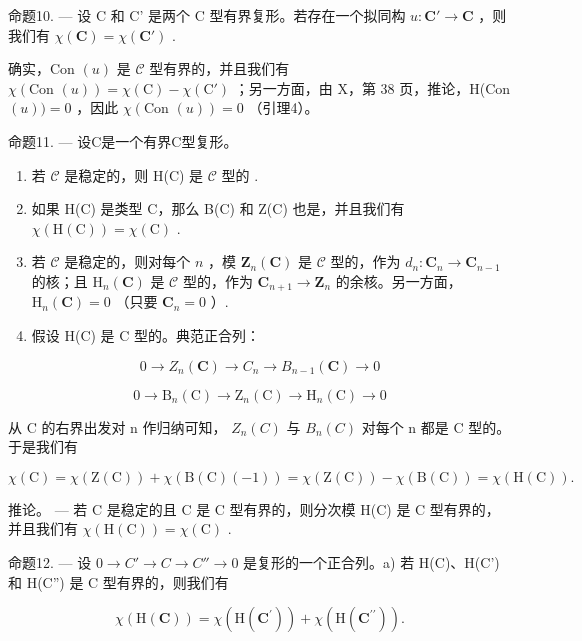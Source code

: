 命题10. --- 设 C 和 C' 是两个 C 型有界复形。若存在一个拟同构 \(u: \mathbf{C}' \to \mathbf{C}\) ，则我们有 \(\chi(\mathbf{C}) = \chi(\mathbf{C}')\) .

确实，Con \((u)\) 是 \(\mathcal{C}\) 型有界的，并且我们有 \(\chi(\text{Con } (u)) = \chi(\text{C}) - \chi(\text{C}')\) ；另一方面，由 X，第 38 页，推论，H(Con \((u)) = 0\) ，因此 \(\chi(\text{Con } (u)) = 0\) （引理4）。

命题11. --- 设C是一个有界C型复形。

\begin{enumerate}
\def\labelenumi{\alph{enumi})}
\item
  若 \(\mathcal{C}\) 是稳定的，则 H(C) 是 \(\mathcal{C}\) 型的 .
\item
  如果 H(C) 是类型 C，那么 B(C) 和 Z(C) 也是，并且我们有 \(\chi(\mathrm{H}(\mathrm{C})) = \chi(\mathrm{C})\) .
\item
  若 \(\mathcal{C}\) 是稳定的，则对每个 \(n\) ，模 \(\mathbf{Z}_n(\mathbf{C})\) 是 \(\mathcal{C}\) 型的，作为 \(d_n: \mathbf{C}_n \to \mathbf{C}_{n-1}\) 的核；且 \(\mathrm{H}_n(\mathbf{C})\) 是 \(\mathcal{C}\) 型的，作为 \(\mathbf{C}_{n+1} \to \mathbf{Z}_n\) 的余核。另一方面， \(\mathrm{H}_n(\mathbf{C}) = 0\) （只要 \(\mathbf{C}_n = 0\) ）.
\item
  假设 H(C) 是 C 型的。典范正合列：
\end{enumerate}

\[
0 \to Z _ {n} (\mathbf {C}) \to C _ {n} \to B _ {n - 1} (\mathbf {C}) \to 0
\]

\[
0 \to \mathrm{B} _ {n} (\mathrm{C}) \to \mathrm{Z} _ {n} (\mathrm{C}) \to \mathrm{H} _ {n} (\mathrm{C}) \to 0
\]

从 C 的右界出发对 n 作归纳可知， \(Z_{n}(C)\) 与 \(B_{n}(C)\) 对每个 n 都是 C 型的。于是我们有

\[
\chi (\mathrm{C}) = \chi (\mathrm{Z} (\mathrm{C})) + \chi (\mathrm{B} (\mathrm{C}) (- 1)) = \chi (\mathrm{Z} (\mathrm{C})) - \chi (\mathrm{B} (\mathrm{C})) = \chi (\mathrm{H} (\mathrm{C})).
\]

推论。 --- 若 C 是稳定的且 C 是 C 型有界的，则分次模 H(C) 是 C 型有界的，并且我们有 \(\chi(\mathrm{H}(\mathrm{C})) = \chi(\mathrm{C})\) .

命题12. --- 设 \(0 \to C' \to C \to C'' \to 0\) 是复形的一个正合列。a) 若 H(C)、H(C') 和 H(C'') 是 C 型有界的，则我们有

\[
\chi (\mathrm{H} (\mathbf {C})) = \chi (\mathrm{H} (\mathbf {C} ^ {\prime})) + \chi (\mathrm{H} (\mathbf {C} ^ {\prime \prime})) .
\]

